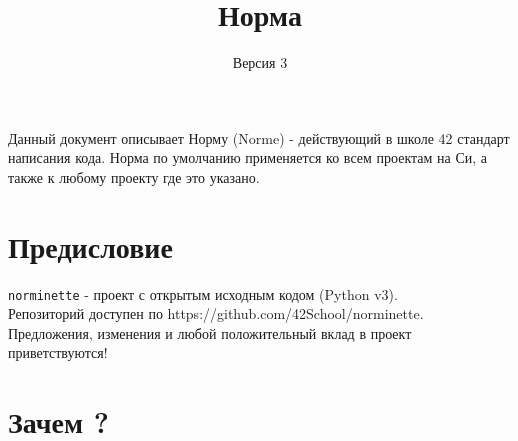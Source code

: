 \documentclass{42-ru}
\begin{document}
\title{Норма}
\subtitle{Версия 3}

\summary
{
    Данный документ описывает Норму (Norme) - действующий в школе 42 стандарт написания кода.
    Норма по умолчанию применяется ко всем проектам на Си, а также к любому проекту где это указано.
}

\maketitle

\tableofcontents



\chapter{Предисловие}

    \texttt{norminette} - проект с открытым исходным кодом (Python v3). \\
    Репозиторий доступен по https://github.com/42School/norminette. \\
    Предложения, изменения и любой положительный вклад в проект приветствуются!

   \newpage


%
%
    \chapter{Зачем ?}
\end{document}
